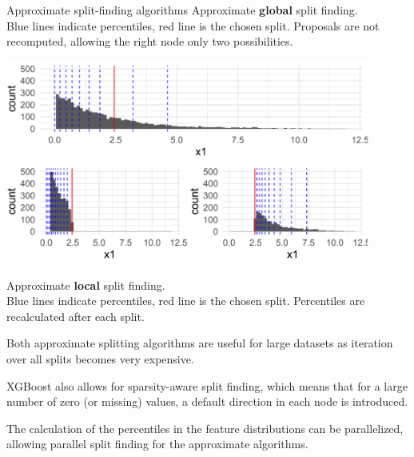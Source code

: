 \begin{vbframe}{Approximate split-finding algorithms}
Approximate \textbf{global} split finding.\\
Blue lines indicate percentiles, red line is the chosen split.
Proposals are not recomputed, allowing the right node only two possibilities.

\framebreak

\vspace{0.2cm}

\begin{center}
\includegraphics[width=0.9\textwidth]{figure_man/split-finding02.png}
\end{center}

Approximate \textbf{local} split finding.\\
Blue lines indicate percentiles, red line is the chosen split.
Percentiles are recalculated after each split.

\framebreak

Both approximate splitting algorithms are useful for large datasets as iteration over all splits becomes very expensive.

\lz

XGBoost also allows for sparsity-aware split finding, which means that for a large number of zero (or missing) values, a default direction in each node is introduced.

\lz

The calculation of the percentiles in the feature distributions can be parallelized, allowing parallel split finding for the approximate algorithms.

\end{vbframe}

